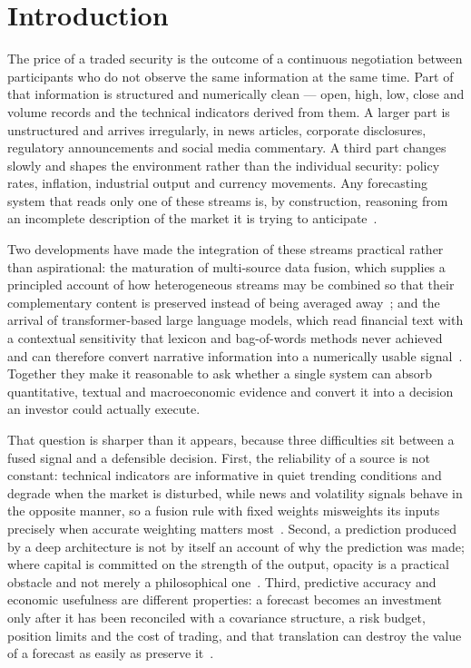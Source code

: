 \chapter{Introduction}

The price of a traded security is the outcome of a continuous negotiation between participants
who do not observe the same information at the same time. Part of that information is
structured and numerically clean --- open, high, low, close and volume records and the
technical indicators derived from them. A larger part is unstructured and arrives irregularly,
in news articles, corporate disclosures, regulatory announcements and social media commentary.
A third part changes slowly and shapes the environment rather than the individual security:
policy rates, inflation, industrial output and currency movements. Any forecasting system that
reads only one of these streams is, by construction, reasoning from an incomplete description
of the market it is trying to anticipate~\cite{snasel2024,long2024}.

Two developments have made the integration of these streams practical rather than
aspirational: the maturation of multi-source data fusion, which supplies a principled account
of how heterogeneous streams may be combined so that their complementary content is preserved
instead of being averaged away~\cite{snasel2024,zhang2022fusion,nti2021}; and the arrival of
transformer-based large language models, which read financial text with a contextual
sensitivity that lexicon and bag-of-words methods never achieved and can therefore convert
narrative information into a numerically usable
signal~\cite{vaswani2017,araci2019,li2024llmsurvey}. Together they make it reasonable to ask
whether a single system can absorb quantitative, textual and macroeconomic evidence and convert
it into a decision an investor could actually execute.

That question is sharper than it appears, because three difficulties sit between a fused signal
and a defensible decision. First, the reliability of a source is not constant: technical
indicators are informative in quiet trending conditions and degrade when the market is
disturbed, while news and volatility signals behave in the opposite manner, so a fusion rule
with fixed weights misweights its inputs precisely when accurate weighting matters
most~\cite{farimani2024,tai2022}. Second, a prediction produced by a deep architecture is not
by itself an account of why the prediction was made; where capital is committed on the strength
of the output, opacity is a practical obstacle and not merely a philosophical
one~\cite{koa2024,lundberg2017}. Third, predictive accuracy and economic usefulness are
different properties: a forecast becomes an investment only after it has been reconciled with a
covariance structure, a risk budget, position limits and the cost of trading, and that
translation can destroy the value of a forecast as easily as preserve
it~\cite{demiguel2009,gu2020}.

